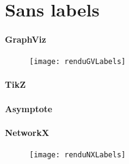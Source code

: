 	\section{Sans labels}
	
\paragraph{GraphViz}

\begin{figure}[h]
\begin{center}
\texttt{[image: renduGVLabels]}
\end{center}
\end{figure}

\paragraph{TikZ}

\begin{figure}[h] \centering \resizebox {!}{0.75\columnwidth} {
\begin{tikzpicture}[scale=0.8, every node/.style={scale=0.8}, node distance=1pt]

\end{tikzpicture}}
\end{figure}

\paragraph{Asymptote}

\begin{figure}[h]

\end{figure}

\paragraph{NetworkX}

\begin{figure}[h]
\begin{center}
\texttt{[image: renduNXLabels]}
\end{center}
\end{figure}